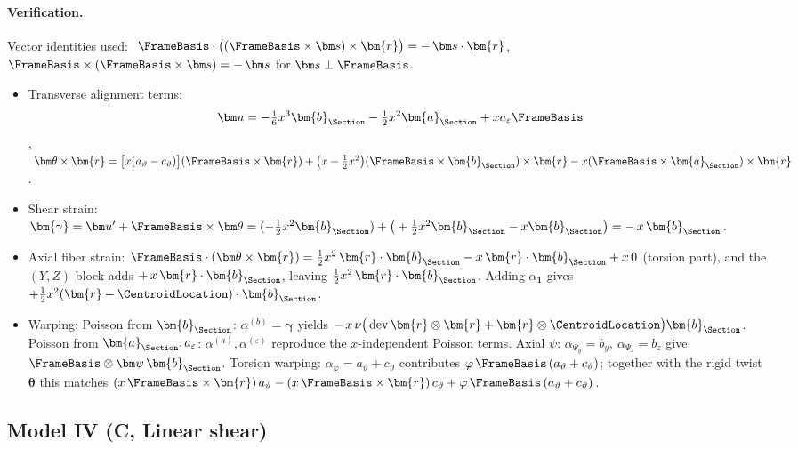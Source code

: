 \paragraph{Verification.}
Vector identities used: \(\ \FrameBasis\cdot\big((\FrameBasis\times\bm s)\times\bm{r}\big)=-\,\bm s\cdot\bm{r}\),\ \ 
\(\FrameBasis\times(\FrameBasis\times\bm s)=-\,\bm s\) for \(\bm s\perp\FrameBasis\).
\begin{itemize}
\item Transverse alignment terms:
\[
\bm u=-\tfrac16 x^3\bm{b}_{\Section} - \tfrac{1}{2} x^2\bm{a}_{\Section} + x a_\varepsilon \FrameBasis
\],
\(\ \bm\theta\times\bm{r}=\big[x(a_\vartheta-c_\vartheta)\big](\FrameBasis\times\bm{r})
+\big(x-\tfrac{1}{2} x^2\big)(\FrameBasis\times\bm{b}_{\Section})\times\bm{r}
- x(\FrameBasis\times\bm{a}_{\Section})\times\bm{r}\).
\item Shear strain:
\(\bm{\gamma}=\bm u'+\FrameBasis\times\bm\theta
= (-\tfrac{1}{2} x^2\bm{b}_{\Section})+\big(+\tfrac{1}{2} x^2\bm{b}_{\Section}- x\bm{b}_{\Section}\big)=-\,x\,\bm{b}_{\Section}\).
\item Axial fiber strain:
\(\FrameBasis\cdot(\bm\theta\times\bm{r})
= \tfrac{1}{2} x^2\,\bm{r}\cdot\bm{b}_{\Section} - x\,\bm{r}\cdot\bm{b}_{\Section}
+ x\,0\) (torsion part),
and the \((Y,Z)\) block adds \(+\,x\,\bm{r}\cdot\bm{b}_{\Section}\), leaving
\(\tfrac{1}{2} x^2\,\bm{r}\cdot\bm{b}_{\Section}\).
Adding \(\alpha_{\mathbf{1}}\) gives \(+\tfrac{1}{2} x^2(\bm{r}-\CentroidLocation)\cdot\bm{b}_{\Section}\).
\item Warping:
Poisson from \(\bm{b}_{\Section}\): \(\alpha^{(b)}=\bm{\gamma}\) yields
\(-\,x\,\nu\big(\operatorname{dev}\bm{r}\otimes\bm{r}+\bm{r}\otimes\CentroidLocation\big)\bm{b}_{\Section}\).
Poisson from \(\bm{a}_{\Section},a_\varepsilon\): \(\alpha^{(a)},\alpha^{(\varepsilon)}\) reproduce the \(x\)-independent Poisson terms.
Axial \(\psi\): \(\alpha_{\Psi_y}=\!b_y,\ \alpha_{\Psi_z}=\!b_z\) give \(\FrameBasis\otimes\bm\psi\,\bm{b}_{\Section}\).
Torsion warping: \(\alpha_\varphi=a_\vartheta+c_\vartheta\) contributes \(\varphi\,\FrameBasis\,(a_\vartheta+c_\vartheta)\);
together with the rigid twist \(\bm\theta\) this matches \((x\,\FrameBasis\times\bm{r})\,a_\vartheta
- (x\,\FrameBasis\times\bm{r})\,c_\vartheta+\varphi\,\FrameBasis\,(a_\vartheta+c_\vartheta)\).
\end{itemize}

\subsection{Model IV (C, Linear shear)}

